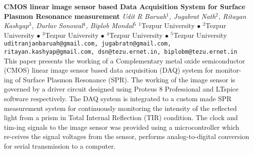 
    \begin{conf-abstract}[]
        {\textbf{CMOS linear image sensor based Data Acquisition System for Surface Plasmon Resonance measurement}}
        {\textit{Udit R Baruah$^{1}$, Jugabrat  Nath$^{2}$, Ritayan Kashyap$^{3}$, Durlav Sonowal$^{4}$, Biplob Mondal$^{5}$}}
        {$^{1}$Tezpur University $\bullet$ $^{2}$Tezpur University $\bullet$ $^{3}$Tezpur University $\bullet$ $^{4}$Tezpur University $\bullet$ $^{5}$Tezpur University}
        {\texttt{uditranjanbaruah@gmail.com, jugabratn@gmail.com, ritayan.kashyap@gmail.com, dsn@tezu.ernet.in, biplobm@tezu.ernet.in}}
        {This paper presents the working of a Complementary metal oxide semiconductor (CMOS) linear image sensor based data acquisition (DAQ) system for monitor-ing of Surface Plasmon Resonance (SPR). The working of the image sensor is governed by a driver circuit designed using Proteus 8 Professional and LTspice software respectively. The DAQ system is integrated to a custom made SPR measurement system for continuously monitoring the intensity of the reflected light from a prism in Total Internal Reflection (TIR) condition. The clock and tim-ing signals to the image sensor was provided using a microcontroller which re-ceives the signal voltages from the sensor, performs analog-to-digital conversion for serial transmission to a computer.}
    \end{conf-abstract}
        
